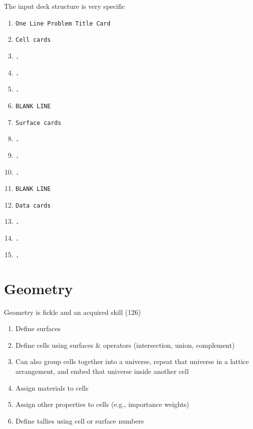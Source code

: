 \documentclass[aspectratio=1610,pdftex,dvipsnames,compress,xcolor={dvipsnames}]{beamer}
\begin{document}
\begin{frame}{The input deck structure is very specific}
    \begin{enumerate}[series=outerlist,topsep=0pt,itemsep=0pt,leftmargin=*,label=(\arabic*)]
        \item[]\texttt{One Line Problem Title Card}
        \item[]\texttt{Cell cards}
        \item[]\texttt{.}
        \item[]\texttt{.}
        \item[]\texttt{.}
        \item[]\texttt{BLANK LINE}
        \item[]\texttt{Surface cards}
        \item[]\texttt{.}
        \item[]\texttt{.}
        \item[]\texttt{.}
        \item[]\texttt{BLANK LINE}
        \item[]\texttt{Data cards}
        \item[]\texttt{.}
        \item[]\texttt{.}
        \item[]\texttt{.}
    \end{enumerate}
\end{frame}


\section{Geometry}


\addtocounter{framenumber}{-1} 
\begin{frame}{Geometry is fickle and an acquired skill (126)}
    \begin{enumerate}[series=outerlist,topsep=0pt,itemsep=21pt,leftmargin=*,label=(\arabic*)]
        \item[]Define surfaces
        \item[]Define cells using surfaces \& operators (intersection, union, complement)
        \item[]Can also group cells together into a universe, repeat that universe in a lattice arrangement, and embed that universe inside another cell
        \item[]Assign materials to cells
        \item[]Assign other properties to cells (e.g., importance weights)
        \item[]Define tallies using cell or surface numbers
    \end{enumerate}
\end{frame}
\end{document}
